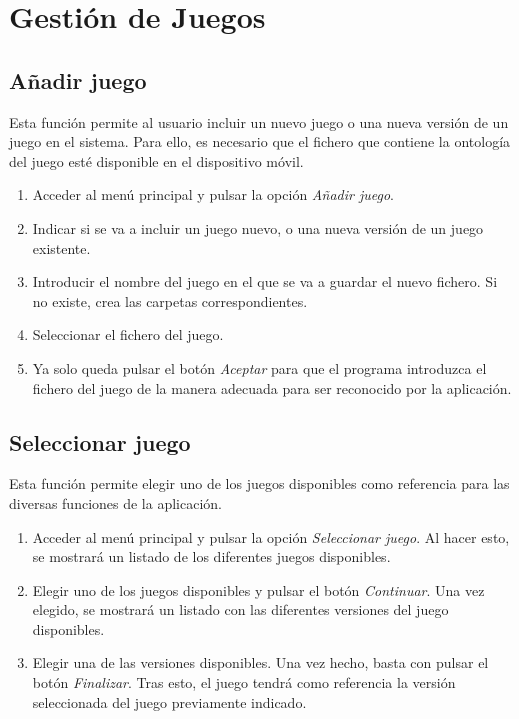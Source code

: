 
\section{Gestión de Juegos}
\subsection{Añadir juego}
Esta función permite al usuario incluir un nuevo juego o una nueva versión de un juego en el 
sistema. Para ello, es necesario que el fichero que contiene la ontología del juego esté 
disponible en el dispositivo móvil.\medskip

\begin{enumerate}
    \item Acceder al menú principal y pulsar la opción \textit{Añadir juego}.
    \item Indicar si se va a incluir un juego nuevo, o una nueva versión de un juego existente.
    \item Introducir el nombre del juego en el que se va a guardar el nuevo fichero. Si no existe, crea las 
    carpetas correspondientes.
    \item Seleccionar el fichero del juego.
    \item Ya solo queda pulsar el botón \textit{Aceptar} para que el programa introduzca el fichero 
    del juego de la manera adecuada para ser reconocido por la aplicación.
\end{enumerate}

\subsection{Seleccionar juego}
Esta función permite elegir uno de los juegos disponibles como referencia para las diversas funciones 
de la aplicación.\medskip

\begin{enumerate}
    \item Acceder al menú principal y pulsar la opción \textit{Seleccionar juego}. Al hacer esto, 
    se mostrará un listado de los diferentes juegos disponibles.
    \item Elegir uno de los juegos disponibles y pulsar el botón \textit{Continuar}. 
    Una vez elegido, se mostrará un listado con las diferentes versiones del juego disponibles.
    \item Elegir una de las versiones disponibles. Una vez hecho, basta con pulsar el botón \textit{Finalizar}.
    Tras esto, el juego tendrá como referencia la versión seleccionada del juego previamente indicado.
\end{enumerate}

